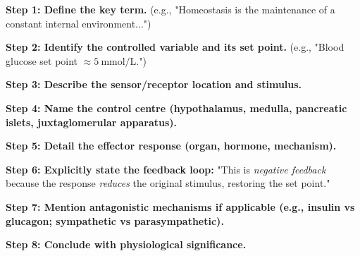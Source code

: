 \documentclass[11pt]{article}
\begin{document}
\begin{methode}
\textbf{Step 1: Define the key term.} (e.g., "Homeostasis is the maintenance of a constant internal environment...")

\textbf{Step 2: Identify the controlled variable and its set point.} (e.g., "Blood glucose set point $\approx \SI{5}{\mmol\per\liter}$.")

\textbf{Step 3: Describe the sensor/receptor location and stimulus.}

\textbf{Step 4: Name the control centre (hypothalamus, medulla, pancreatic islets, juxtaglomerular apparatus).}

\textbf{Step 5: Detail the effector response (organ, hormone, mechanism).}

\textbf{Step 6: Explicitly state the feedback loop:} "This is \emph{negative feedback} because the response \emph{reduces} the original stimulus, restoring the set point."

\textbf{Step 7: Mention antagonistic mechanisms if applicable (e.g., insulin vs glucagon; sympathetic vs parasympathetic).}

\textbf{Step 8: Conclude with physiological significance.}
\end{methode}
\end{document}

